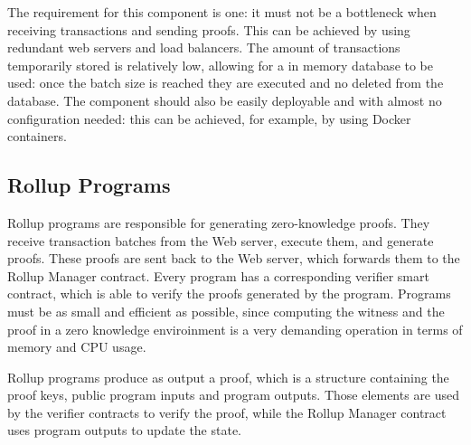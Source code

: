 The requirement for this component is one: it must not be a bottleneck when receiving transactions and sending proofs. This can be achieved by using redundant web servers and load balancers. The amount of transactions temporarily stored is relatively low, allowing for a in memory database to be used: once the batch size is reached  they are executed and no deleted from the database. The component should also be easily deployable and with almost no configuration needed: this can be achieved, for example, by using Docker containers.

\subsection{Rollup Programs\label{sec:designrollupprograms}}
Rollup programs are responsible for generating zero-knowledge proofs. They receive transaction batches from the Web server, execute them, and generate proofs. These proofs are sent back to the Web server, which forwards them to the Rollup Manager contract. Every program has a corresponding verifier smart contract, which is able to verify the proofs generated by the program. Programs must be as small and efficient as possible, since computing the witness and the proof in a zero knowledge enviroinment is a very demanding operation in terms of memory and CPU usage.

Rollup programs produce as output a proof, which is a structure containing the proof keys, public program inputs and program outputs. Those elements are used by the verifier contracts to verify the proof, while the Rollup Manager contract uses program outputs to update the state.
